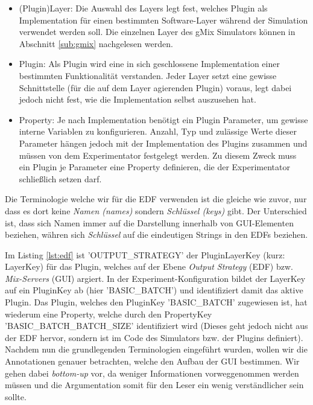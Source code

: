 \documentclass[a4paper, 11pt]{article} %
\begin{document}
\begin{itemize}
	\item (Plugin)Layer: Die Auswahl des Layers legt fest, welches Plugin als Implementation für einen bestimmten Software-Layer während der Simulation verwendet werden soll. Die einzelnen Layer des gMix Simulators können in Abschnitt \ref{sub:gmix} nachgelesen werden. 
	\item Plugin: Als Plugin wird eine in sich geschlossene Implementation einer bestimmten Funktionalität verstanden. Jeder Layer setzt eine gewisse Schnittstelle (für die auf dem Layer agierenden Plugin) voraus, legt dabei jedoch nicht fest, wie die Implementation selbst auszusehen hat.
	\item Property: Je nach Implementation benötigt ein Plugin Parameter, um gewisse interne Variablen zu konfigurieren. Anzahl, Typ und zulässige Werte dieser Parameter hängen jedoch mit der Implementation des Plugins zusammen und müssen von dem Experimentator festgelegt werden. Zu diesem Zweck muss ein Plugin je Parameter eine Property definieren, die der Experimentator schließlich setzen darf.
\end{itemize} 

Die Terminologie welche wir für die EDF verwenden ist die gleiche wie zuvor, nur dass es dort keine \emph{Namen (names)} sondern \emph{Schlüssel (keys)} gibt. Der Unterschied ist, dass sich Namen immer auf die Darstellung innerhalb von GUI-Elementen beziehen, währen sich \emph{Schlüssel} auf die eindeutigen Strings in den EDFs beziehen.

Im Listing \ref{lst:edf} ist 'OUTPUT\_STRATEGY' der PluginLayerKey (kurz: LayerKey) für das Plugin, welches auf der Ebene \emph{Output Strategy} (EDF) bzw.  \emph{Mix-Servers} (GUI) argiert. In der Experiment-Konfiguration bildet der LayerKey auf ein PluginKey ab (hier 'BASIC\_BATCH') und identifiziert damit das aktive Plugin. Das Plugin, welches den PluginKey 'BASIC\_BATCH' zugewiesen ist, hat wiederum eine Property, welche durch den PropertyKey 'BASIC\_BATCH\_BATCH\_SIZE' identifiziert wird (Dieses geht jedoch nicht aus der EDF hervor, sondern ist im Code des Simulators bzw. der Plugins definiert).\\

Nachdem nun die grundlegenden Terminologien eingeführt wurden, wollen wir die Annotationen genauer betrachten, welche den Aufbau der GUI bestimmen. Wir gehen dabei \emph{bottom-up} vor, da weniger Informationen vorweggenommen werden müssen und die Argumentation somit für den Leser ein wenig verständlicher sein sollte.
\end{document}
